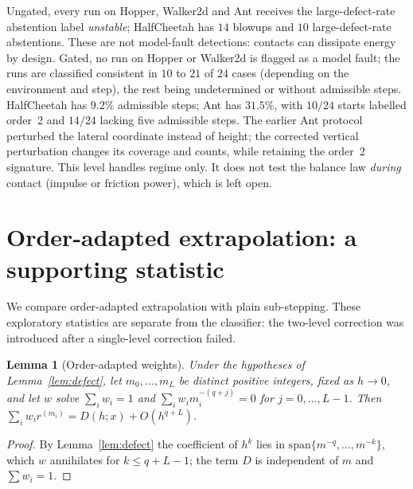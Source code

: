 \documentclass[10pt]{article}
\newtheorem{lemma}{Lemma}
\theoremstyle{definition}
\newcommand{\fittable}[2][\linewidth]{%
  \sbox{\tablebox}{#2}%
  \ifdim\wd\tablebox>#1\relax
    \resizebox{#1}{!}{\usebox{\tablebox}}%
  \else
    \usebox{\tablebox}%
  \fi}
\begin{document}
\begin{table}[htbp]
\centering\small
\fittable{}
\caption{Regime-gated fingerprint with contacts and joint limits enabled,
using the enlarged macro steps shown.
``None'' means fewer than five admissible steps; ``undetermined'' means the
finest residual is below the float64 floor. The gated energy scale is computed
on the same admissible steps as its residuals.}
\label{tab:gate}
\end{table}

Ungated, every run on Hopper, Walker2d and Ant receives the large-defect-rate
abstention label \emph{unstable}; HalfCheetah has $14$ blowups and $10$
large-defect-rate abstentions. These are not model-fault detections: contacts
can dissipate energy by design. Gated, no run on Hopper or Walker2d is flagged
as a model fault; the runs are classified consistent in $10$ to $21$ of $24$ cases (depending on the environment and step), the rest being undetermined or
without admissible steps. HalfCheetah has $9.2\%$ admissible steps; Ant has $31.5\%$, with
$10/24$ starts labelled order~2 and $14/24$ lacking five admissible steps.
The earlier Ant protocol perturbed the lateral coordinate instead of height;
the corrected vertical perturbation changes its coverage and counts,
while retaining the order~2 signature. This level handles regime only. It does not test the balance
law \emph{during} contact (impulse or friction power), which is left open.

\section{Order-adapted extrapolation: a supporting statistic}\label{app:extrap}

We compare order-adapted extrapolation with plain sub-stepping. These
exploratory statistics are separate from the classifier: the two-level
correction was introduced after a single-level correction failed.

\begin{lemma}[Order-adapted weights]\label{lem:weights}
Under the hypotheses of Lemma~\ref{lem:defect}, let $m_0,\dots,m_L$ be
distinct positive integers, fixed as $h\to0$, and let $w$ solve $\sum_iw_i=1$ and
$\sum_iw_im_i^{-(q+j)}=0$ for $j=0,\dots,L-1$. Then
$\sum_iw_ir^{(m_i)}=D(h;x)+O(h^{q+L})$.
\end{lemma}

\begin{proof}
By Lemma~\ref{lem:defect} the coefficient of $h^k$ lies in
$\mathrm{span}\{m^{-q},\dots,m^{-k}\}$, which $w$ annihilates for $k\le q+L-1$;
the term $D$ is independent of $m$ and $\sum w_i=1$.
\end{proof}
\end{document}
